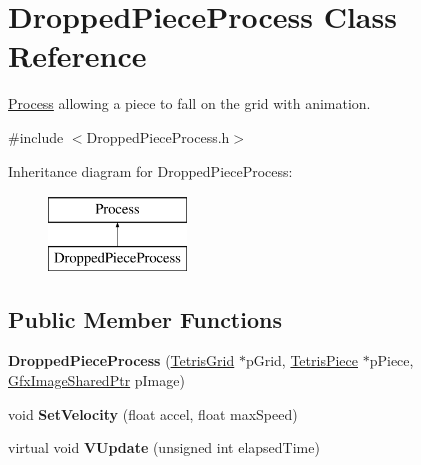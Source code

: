 \hypertarget{classDroppedPieceProcess}{\section{Dropped\-Piece\-Process Class Reference}
\label{classDroppedPieceProcess}
}


\hyperlink{classProcess}{Process} allowing a piece to fall on the grid with animation.  




{\ttfamily \#include $<$Dropped\-Piece\-Process.\-h$>$}

Inheritance diagram for Dropped\-Piece\-Process\-:\begin{figure}[H]
\begin{center}
\leavevmode
\includegraphics[height=2.000000cm]{classDroppedPieceProcess}
\end{center}
\end{figure}
\subsection*{Public Member Functions}
\begin{DoxyCompactItemize}
\item 
\hypertarget{classDroppedPieceProcess_a0108f48b2ea5a994acd6516286ddbc88}{{\bfseries Dropped\-Piece\-Process} (\hyperlink{classTetrisGrid}{Tetris\-Grid} $\ast$p\-Grid, \hyperlink{classTetrisPiece}{Tetris\-Piece} $\ast$p\-Piece, \hyperlink{GfxImage_8h_a42b2baf6110731a1a358d365e303e086}{Gfx\-Image\-Shared\-Ptr} p\-Image)}\label{classDroppedPieceProcess_a0108f48b2ea5a994acd6516286ddbc88}

\item 
\hypertarget{classDroppedPieceProcess_aae4b651bdd2f18d5a4f2a5873393a40d}{void {\bfseries Set\-Velocity} (float accel, float max\-Speed)}\label{classDroppedPieceProcess_aae4b651bdd2f18d5a4f2a5873393a40d}

\item 
\hypertarget{classDroppedPieceProcess_aeaedfdb8a1c487573ccf2ba06438b5c3}{virtual void {\bfseries V\-Update} (unsigned int elapsed\-Time)}\label{classDroppedPieceProcess_aeaedfdb8a1c487573ccf2ba06438b5c3}

\end{DoxyCompactItemize}
